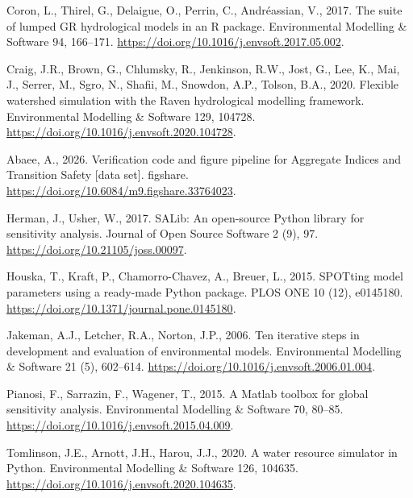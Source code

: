 \documentclass[3p,11pt]{elsarticle}
\begin{document}
\begin{thebibliography}{}
Coron, L., Thirel, G., Delaigue, O., Perrin, C., Andr\'eassian, V., 2017.
The suite of lumped GR hydrological models in an R package. Environmental
Modelling \& Software 94, 166--171.
\url{https://doi.org/10.1016/j.envsoft.2017.05.002}.

Craig, J.R., Brown, G., Chlumsky, R., Jenkinson, R.W., Jost, G., Lee, K.,
 Mai, J., Serrer, M., Sgro, N., Shafii, M., Snowdon, A.P., Tolson, B.A.,
 2020. Flexible watershed simulation with the Raven hydrological modelling
 framework. Environmental Modelling \& Software 129, 104728.
 \url{https://doi.org/10.1016/j.envsoft.2020.104728}.

Abaee, A., 2026. Verification code and figure pipeline for Aggregate
Indices and Transition Safety [data set]. figshare.
\url{https://doi.org/10.6084/m9.figshare.33764023}.

Herman, J., Usher, W., 2017. SALib: An open-source Python library for
sensitivity analysis. Journal of Open Source Software 2 (9), 97.
\url{https://doi.org/10.21105/joss.00097}.

Houska, T., Kraft, P., Chamorro-Chavez, A., Breuer, L., 2015. SPOTting
model parameters using a ready-made Python package. PLOS ONE 10 (12),
e0145180. \url{https://doi.org/10.1371/journal.pone.0145180}.

Jakeman, A.J., Letcher, R.A., Norton, J.P., 2006. Ten iterative steps in
development and evaluation of environmental models. Environmental Modelling
\& Software 21 (5), 602--614. \url{https://doi.org/10.1016/j.envsoft.2006.01.004}.

Pianosi, F., Sarrazin, F., Wagener, T., 2015. A Matlab toolbox for global
sensitivity analysis. Environmental Modelling \& Software 70, 80--85.
\url{https://doi.org/10.1016/j.envsoft.2015.04.009}.

Tomlinson, J.E., Arnott, J.H., Harou, J.J., 2020. A water resource
simulator in Python. Environmental Modelling \& Software 126, 104635.
\url{https://doi.org/10.1016/j.envsoft.2020.104635}.

\end{thebibliography}
\end{document}
